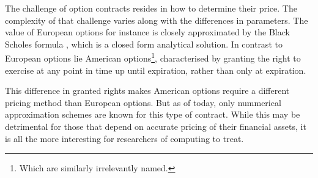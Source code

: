 The challenge of option contracts resides in how to determine their price. The
complexity of that challenge varies along with the differences in parameters.
The value of European options for instance is closely approximated by the Black
Scholes formula , which is a closed form analytical solution.
In contrast to European options lie American options\footnote{Which are
similarly irrelevantly named.}, characterised by granting the right to exercise
at any point in time up until expiration, rather than only at expiration.

This difference in granted rights makes American options require a different
pricing method than European options. But as of today, only nummerical
approximation schemes are known for this type of contract. While this may be
detrimental for those that depend on accurate pricing of their financial
assets, it is all the more interesting for researchers of computing to treat.

